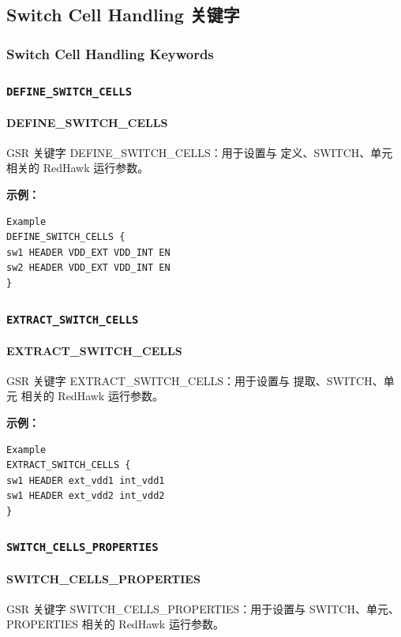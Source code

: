 \subsection{Switch Cell Handling 关键字}
\subsubsection*{Switch Cell Handling Keywords}

\subsubsection{\texttt{DEFINE_SWITCH_CELLS}}
\paragraph*{DEFINE_SWITCH_CELLS}

GSR 关键字 DEFINE_SWITCH_CELLS：用于设置与 定义、SWITCH、单元 相关的 RedHawk 运行参数。

\textbf{示例：}
\begin{lstlisting}
Example
DEFINE_SWITCH_CELLS {
sw1 HEADER VDD_EXT VDD_INT EN
sw2 HEADER VDD_EXT VDD_INT EN
}
\end{lstlisting}

\subsubsection{\texttt{EXTRACT_SWITCH_CELLS}}
\paragraph*{EXTRACT_SWITCH_CELLS}

GSR 关键字 EXTRACT_SWITCH_CELLS：用于设置与 提取、SWITCH、单元 相关的 RedHawk 运行参数。

\textbf{示例：}
\begin{lstlisting}
Example
EXTRACT_SWITCH_CELLS {
sw1 HEADER ext_vdd1 int_vdd1
sw1 HEADER ext_vdd2 int_vdd2
}
\end{lstlisting}

\subsubsection{\texttt{SWITCH_CELLS_PROPERTIES}}
\paragraph*{SWITCH_CELLS_PROPERTIES}

GSR 关键字 SWITCH_CELLS_PROPERTIES：用于设置与 SWITCH、单元、PROPERTIES 相关的 RedHawk 运行参数。

